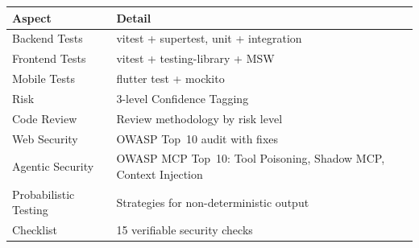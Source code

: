 \begin{center}
\begin{tabularx}{\textwidth}{l X}
\toprule
\textbf{Aspect} & \textbf{Detail} \\
\midrule
Backend Tests & vitest + supertest, unit + integration \\
Frontend Tests & vitest + testing-library + MSW \\
Mobile Tests & flutter test + mockito \\
Risk & 3-level Confidence Tagging \\
Code Review & Review methodology by risk level \\
Web Security & OWASP Top~10 audit with fixes \\
Agentic Security & OWASP MCP Top~10: Tool Poisoning, Shadow MCP, Context Injection \\
Probabilistic Testing & Strategies for non-deterministic output \\
Checklist & 15 verifiable security checks \\
\bottomrule
\end{tabularx}
\end{center}
